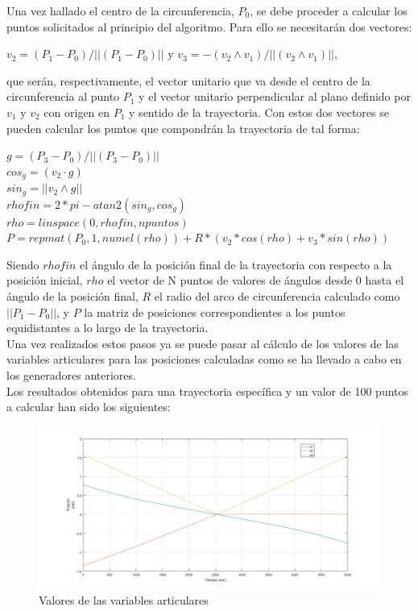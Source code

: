 	Una vez hallado el centro de la circunferencia, $P_0$, se debe proceder a calcular los puntos solicitados al principio del algoritmo. Para ello se necesitarán dos vectores:
	\begin{center}
		$v_2=(P_1-P_0)/||(P_1-P_0)||$ y $v_3=-(v_2 \wedge v_1)/||(v_2 \wedge v_1)||$,\\
	\end{center}
	que serán, respectivamente, el vector unitario que va desde el centro de la circunferencia al punto $P_1$ y el vector unitario perpendicular al plano definido por $v_1$ y $v_2$ con origen en $P_1$ y sentido de la trayectoria. Con estos dos vectores se pueden calcular los puntos que compondrán la trayectoria de tal forma:\\
	
	\begin{center}
		$g=(P_3-P_0)/||(P_3-P_0)||$\\
		$cos_g=(v_2 \cdot g)$\\
		$sin_g=||v_2 \wedge g||$\\
		$rhofin=2*pi-atan2(sin_g,cos_g)$\\
		$rho=linspace(0,rhofin,npuntos)$\\
		$P=repmat(P_0,1,numel(rho))+R*(v_2*cos(rho)+v_3*sin(rho))$\\
	\end{center}

	Siendo $rhofin$ el ángulo de la posición final de la trayectoria con respecto a la posición inicial, $rho$ el vector de N puntos de valores de ángulos desde 0 hasta el ángulo de la posición final, $R$ el radio del arco de circunferencia calculado como $||P_1-P_0||$, y $P$ la matriz de posiciones correspondientes a los puntos equidistantes a lo largo de la trayectoria.\\
	
	Una vez realizados estos pasos ya se puede pasar al cálculo de los valores de las variables articulares para las posiciones calculadas como se ha llevado a cabo en los generadores anteriores.\\
	
	Los resultados obtenidos para una trayectoria específica y un valor de 100 puntos a calcular han sido los siguientes:\\
	
	\begin{figure}[H]
	\centering
	\includegraphics[width=1\textwidth]{GDT_C_articulares}
	\caption{Valores de las variables articulares}
	\end{figure}

